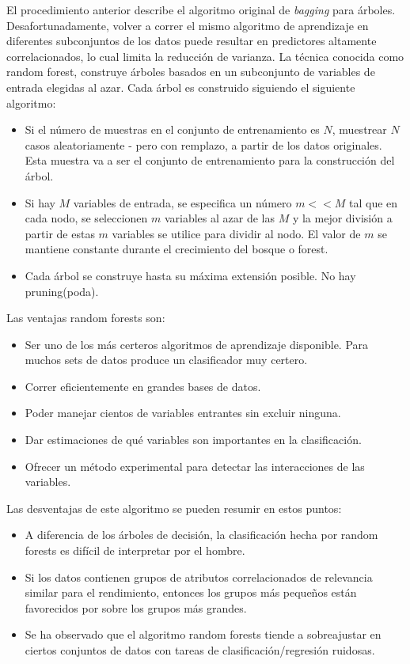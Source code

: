 	El procedimiento anterior describe el algoritmo original de \textit{bagging} para árboles. Desafortunadamente, volver a correr el mismo algoritmo de aprendizaje en diferentes subconjuntos de los datos puede resultar en predictores altamente correlacionados, lo cual limita la reducción de varianza. La técnica conocida como random forest, construye árboles basados en un subconjunto de variables de entrada elegidas al azar. Cada árbol es construido siguiendo el siguiente algoritmo:
	\begin{itemize}
		\item Si el número de muestras en el conjunto de entrenamiento es $N$, muestrear $N$ casos aleatoriamente - pero con remplazo, a partir de los datos originales. Esta muestra va a ser el conjunto de entrenamiento para la construcción del árbol.
		\item Si hay $M$ variables de entrada, se especifica un número $m<<M$ tal que en cada nodo, se seleccionen $m$ variables al azar de las $M$ y la mejor división a partir de estas $m$ variables se utilice para dividir al nodo. El valor de $m$ se mantiene constante durante el crecimiento del bosque o forest.
		\item Cada árbol se construye hasta su máxima extensión posible. No hay pruning(poda).
	\end{itemize}
	Las ventajas random forests son:
	\begin{itemize}
		\item Ser uno de los más certeros algoritmos de aprendizaje disponible. Para muchos sets de datos produce un clasificador muy certero.
		\item Correr eficientemente en grandes bases de datos.
		\item Poder manejar cientos de variables entrantes sin excluir ninguna.
		\item Dar estimaciones de qué variables son importantes en la clasificación.
		\item Ofrecer un método experimental para detectar las interacciones de las variables.
	\end{itemize}
	Las desventajas de este algoritmo se pueden resumir en estos puntos:
	\begin{itemize}
		\item A diferencia de los árboles de decisión, la clasificación hecha por random forests es difícil de interpretar por el hombre.
		\item Si los datos contienen grupos de atributos correlacionados de relevancia similar para el rendimiento, entonces los grupos más pequeños están favorecidos por sobre los grupos más grandes.
		\item Se ha observado que el algoritmo random forests tiende a sobreajustar en ciertos conjuntos de datos con tareas de clasificación/regresión ruidosas.
	\end{itemize}